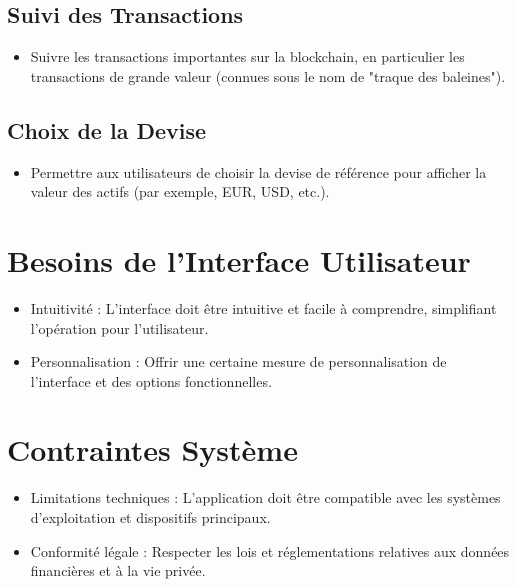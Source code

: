 \documentclass{article}
\begin{document}
\subsection{Suivi des Transactions}
\begin{itemize}
    \item Suivre les transactions importantes sur la blockchain, en particulier les transactions de grande valeur (connues sous le nom de "traque des baleines").
\end{itemize}

\subsection{Choix de la Devise}
\begin{itemize}
    \item Permettre aux utilisateurs de choisir la devise de référence pour afficher la valeur des actifs (par exemple, EUR, USD, etc.).
\end{itemize}

\section{Besoins de l'Interface Utilisateur}
\begin{itemize}
    \item Intuitivité : L'interface doit être intuitive et facile à comprendre, simplifiant l'opération pour l'utilisateur.
    \item Personnalisation : Offrir une certaine mesure de personnalisation de l'interface et des options fonctionnelles.
\end{itemize}

\section{Contraintes Système}
\begin{itemize}
    \item Limitations techniques : L'application doit être compatible avec les systèmes d'exploitation et dispositifs principaux.
    \item Conformité légale : Respecter les lois et réglementations relatives aux données financières et à la vie privée.
\end{itemize}
\end{document}
